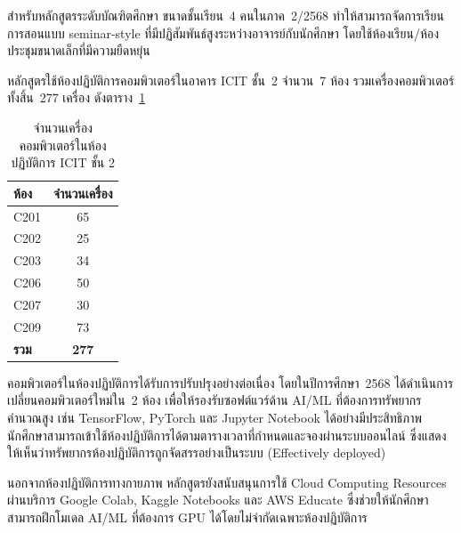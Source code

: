 สำหรับหลักสูตรระดับบัณฑิตศึกษา ขนาดชั้นเรียน~4 คนในภาค~2/2568 ทำให้สามารถจัดการเรียนการสอนแบบ seminar-style ที่มีปฏิสัมพันธ์สูงระหว่างอาจารย์กับนักศึกษา โดยใช้ห้องเรียน/ห้องประชุมขนาดเล็กที่มีความยืดหยุ่น


หลักสูตรใช้ห้องปฏิบัติการคอมพิวเตอร์ในอาคาร ICIT ชั้น~2 จำนวน~7 ห้อง รวมเครื่องคอมพิวเตอร์ทั้งสิ้น~277 เครื่อง ดังตาราง~\ref{tbl:lab_computers}

\begin{table}[H]
  \centering
  \caption{จำนวนเครื่องคอมพิวเตอร์ในห้องปฏิบัติการ ICIT ชั้น 2}
  \label{tbl:lab_computers}
  \begingroup
  \footnotesize
  \renewcommand{\arraystretch}{1.2}
  \begin{tabular}{|l|c|}
    \hline
    \textbf{ห้อง} & \textbf{จำนวนเครื่อง} \\
    \hline
    C201 & 65 \\
    \hline
    C202 & 25 \\
    \hline
    C203 & 34 \\
    \hline
    C206 & 50 \\
    \hline
    C207 & 30 \\
    \hline
    C209 & 73 \\
    \hline
    \textbf{รวม} & \textbf{277} \\
    \hline
  \end{tabular}
  \endgroup
\end{table}

คอมพิวเตอร์ในห้องปฏิบัติการได้รับการปรับปรุงอย่างต่อเนื่อง โดยในปีการศึกษา~2568 ได้ดำเนินการเปลี่ยนคอมพิวเตอร์ใหม่ใน~2 ห้อง เพื่อให้รองรับซอฟต์แวร์ด้าน AI/ML ที่ต้องการทรัพยากรคำนวณสูง เช่น TensorFlow, PyTorch และ Jupyter Notebook ได้อย่างมีประสิทธิภาพ นักศึกษาสามารถเข้าใช้ห้องปฏิบัติการได้ตามตารางเวลาที่กำหนดและจองผ่านระบบออนไลน์ ซึ่งแสดงให้เห็นว่าทรัพยากรห้องปฏิบัติการถูกจัดสรรอย่างเป็นระบบ (Effectively deployed)

นอกจากห้องปฏิบัติการทางกายภาพ หลักสูตรยังสนับสนุนการใช้ Cloud Computing Resources ผ่านบริการ Google Colab, Kaggle Notebooks และ AWS Educate ซึ่งช่วยให้นักศึกษาสามารถฝึกโมเดล AI/ML ที่ต้องการ GPU ได้โดยไม่จำกัดเฉพาะห้องปฏิบัติการ


